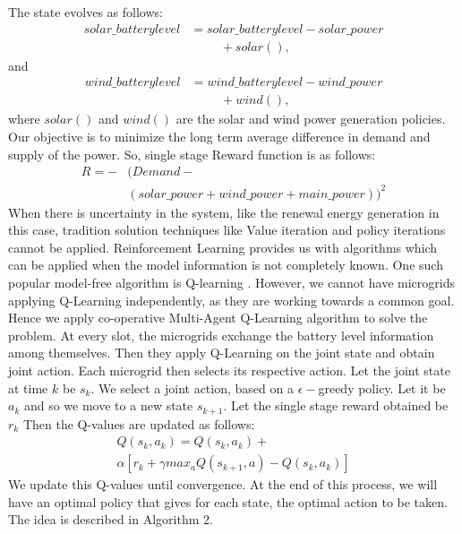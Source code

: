 \documentclass[conference]{IEEEtran}
\begin{document}
The state evolves as follows:
\begin{equation}
\begin{split}
solar\_batterylevel &= solar\_batterylevel - solar\_power \\&\hspace{1cm}+ solar(), 
\end{split}
\end{equation}
and
\begin{equation}
\begin{split}
wind\_batterylevel &= wind\_batterylevel - wind\_power 
\\&\hspace{1cm}  + wind(),
\end{split}
\end{equation}
where
$solar()$ and $wind()$ are the solar and wind power generation policies. 
Our objective is to minimize the long term average difference in demand and supply of the power. So, single stage Reward function is as follows:
\begin{equation}
\begin{split}
R = -&(Demand - \\
&(solar\_power+wind\_power+main\_power))^2
\end{split}
\end{equation}
When there is uncertainty in the system, like the renewal energy generation in this case, tradition solution techniques like Value iteration and policy iterations cannot be applied. Reinforcement Learning provides us with algorithms which can be applied when the model information is not completely known. One such popular model-free algorithm is Q-learning \cite{vol2}. However, we cannot have microgrids applying Q-Learning independently, as they are working towards a common goal. Hence we apply co-operative Multi-Agent Q-Learning algorithm \cite{marl} to solve the problem. At every slot, the microgrids exchange the battery level information among themselves. Then they apply Q-Learning on the joint state and obtain joint action. Each microgrid then selects its respective action. Let the joint state at time $k$ be $s_{k}$. We select a joint action, based on a $\epsilon-$greedy policy. Let it be $a_{k}$ and so we move to a new state $s_{k+1}$. Let the single stage reward obtained be $r_{k}$ Then the Q-values are updated as follows:
\begin{equation}\label{Q-val}
\begin{split}
Q(s_{k},a_{k}) = Q(s_{k},a_{k}) + \\
 \alpha[r_{k}+\gamma max_{a}Q(s_{k+1},a) - Q(s_{k},a_{k})] 
\end{split}
\end{equation}
We update this Q-values until convergence. At the end of this process, we will have an optimal policy that gives for each state, the optimal action to be taken. The idea is described in  Algorithm 2. 
\end{document}
